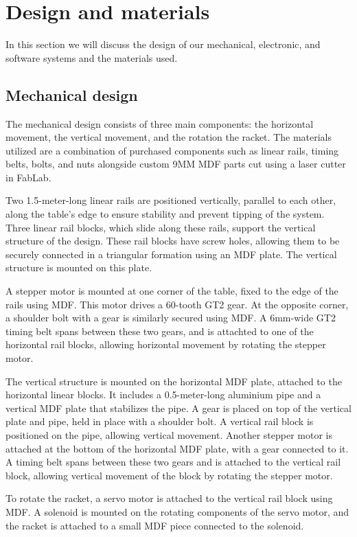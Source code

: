 \chapter{Design and materials}
In this section we will discuss the design of our mechanical, electronic, and software systems and the materials used.

\section{Mechanical design}
The mechanical design consists of three main components: the horizontal movement,  the vertical movement,  and the rotation the racket. 
The materials utilized are a combination of purchased components such as linear rails, timing belts, bolts, and nuts  
alongside custom 9MM MDF parts cut using a laser cutter in FabLab.

Two 1.5-meter-long linear rails are positioned vertically, parallel to each other, along the table's edge to ensure stability and prevent tipping of the system. 
Three linear rail blocks, which slide along these rails, support the vertical structure of the design. 
These rail blocks have screw holes, allowing them to be securely connected in a triangular formation using an MDF plate.
The vertical structure is mounted on this plate.

A stepper motor is mounted at one corner of the table, fixed to the edge of the rails using MDF. 
This motor drives a 60-tooth GT2 gear. 
At the opposite corner, a shoulder bolt with a gear is similarly secured using MDF. 
A 6mm-wide GT2 timing belt spans between these two gears, and is attachted to one of the horizontal rail blocks, allowing horizontal movement by rotating the stepper motor.

The vertical structure is mounted on the horizontal MDF plate, attached to the horizontal linear blocks. 
It includes a 0.5-meter-long aluminium pipe and a vertical MDF plate that stabilizes the pipe.
A gear is placed on top of the vertical plate and pipe, held in place with a shoulder bolt.
A vertical rail block is positioned on the pipe, allowing vertical movement.
Another stepper motor is attached at the bottom of the horizontal MDF plate, with a gear connected to it.
A timing belt spans between these two gears and is attached to the vertical rail block, allowing vertical movement of the block by rotating the stepper motor.

To rotate the racket, a servo motor is attached to the vertical rail block using MDF. 
A solenoid is mounted on the rotating components of the servo motor, and the racket is attached to a small MDF piece connected to the solenoid.
 
